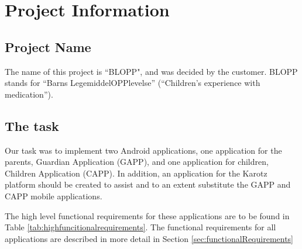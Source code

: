 \section{Project Information}
\label{sec:prosec}
\subsection{Project Name}
The name of this project is ``BLOPP", and was decided by the customer. BLOPP stands for ``Barns 
LegemiddelOPPlevelse'' (``Children's experience with medication'').  



\subsection{The task}
Our task was to implement two Android applications, one application for the parents, Guardian Application (GAPP), 
and one application for children, Children Application (CAPP). In addition, an application for the Karotz platform 
should be created to assist and to an extent substitute the GAPP and CAPP mobile applications. 

The high level functional requirements for these applications are to be found in Table 
\ref{tab:highfuncitionalrequirements}. The functional requirements for all applications are described in more detail 
in Section \ref{sec:functionalRequirements}

